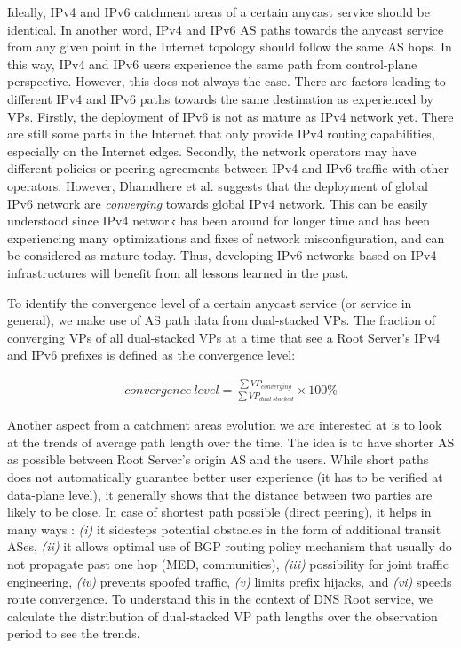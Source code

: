 Ideally, IPv4 and IPv6 catchment areas of a certain anycast service should be identical. In another word, IPv4 and IPv6 AS paths towards the anycast service from any given point in the Internet topology should follow the same AS hops. In this way,  IPv4 and IPv6 users experience the same path from control-plane perspective. However, this does not always the case. There are factors leading to different IPv4 and IPv6 paths towards the same destination as experienced by VPs. Firstly, the deployment of IPv6 is not as mature as IPv4 network yet. There are still some parts in the Internet that only provide IPv4 routing capabilities, especially on the Internet edges. Secondly, the network operators may have different policies or peering agreements between IPv4 and IPv6 traffic with other operators. However, Dhamdhere et al. \cite{Dhamdhere:2012:MDI:2398776.2398832} suggests that the deployment of global IPv6 network are \textit{converging} towards global IPv4 network. This can be easily understood since IPv4 network has been around for longer time and has been experiencing many optimizations and fixes of network misconfiguration, and can be considered as mature today. Thus, developing IPv6 networks based on IPv4 infrastructures will benefit from all lessons learned in the past.


To identify the convergence level of a certain anycast service (or service in general), we make use of AS path data from dual-stacked VPs. The fraction of converging VPs of all dual-stacked VPs at a time that see a Root Server's IPv4 and IPv6 prefixes is defined as the convergence level:

\begin{align*}
convergence\: level=\frac{\sum VP_{converging}}{\sum VP_{dual \: stacked}} \times 100\%
\end{align*}

Another aspect from a catchment areas evolution we are interested at is to look at the trends of average path length over the time. The idea is to have shorter AS as possible between Root Server's origin AS and the users. While short paths does not automatically guarantee better user experience (it has to be verified at data-plane level), it generally shows that the distance between two parties are likely to be close. In case of shortest path possible (direct peering), it helps in many ways \cite{Chiu:2015:WOH:2815675.2815719}:  \textit{(i)} it sidesteps potential obstacles in the form of additional transit ASes, \textit{(ii)} it allows optimal use of BGP routing policy mechanism that usually do not propagate past one hop (MED, communities), \textit{(iii)} possibility for joint traffic engineering, \textit{(iv)} prevents spoofed traffic, \textit{(v)} limits prefix hijacks, and \textit{(vi)} speeds route convergence. To understand this in the context of DNS Root service, we calculate the distribution of dual-stacked VP path lengths over the observation period to see the trends.

